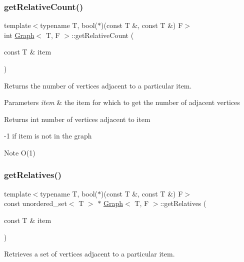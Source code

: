 \subsubsection{\texorpdfstring{get\+Relative\+Count()}{getRelativeCount()}}
{\footnotesize\ttfamily template$<$typename T, bool($\ast$)(const T \&, const T \&) F$>$ \\
int \hyperlink{class_graph}{Graph}$<$ T, F $>$\+::get\+Relative\+Count (\begin{DoxyParamCaption}\item[{const T \&}]{item }\end{DoxyParamCaption})}



Returns the number of vertices adjacent to a particular item. 


\begin{DoxyParams}{Parameters}
{\em item} & the item for which to get the number of adjacent vertices \\
\hline
\end{DoxyParams}
\begin{DoxyReturn}{Returns}
int number of vertices adjacent to item 

-\/1 if item is not in the graph
\end{DoxyReturn}
\begin{DoxyNote}{Note}
O(1) 
\end{DoxyNote}
\mbox{\label{class_graph_add90c1bc37771d0bf57515fd30d4c6c4}} 
\subsubsection{\texorpdfstring{get\+Relatives()}{getRelatives()}}
{\footnotesize\ttfamily template$<$typename T, bool($\ast$)(const T \&, const T \&) F$>$ \\
const unordered\+\_\+set$<$ T $>$ $\ast$ \hyperlink{class_graph}{Graph}$<$ T, F $>$\+::get\+Relatives (\begin{DoxyParamCaption}\item[{const T \&}]{item }\end{DoxyParamCaption})}



Retrieves a set of vertices adjacent to a particular item. 


